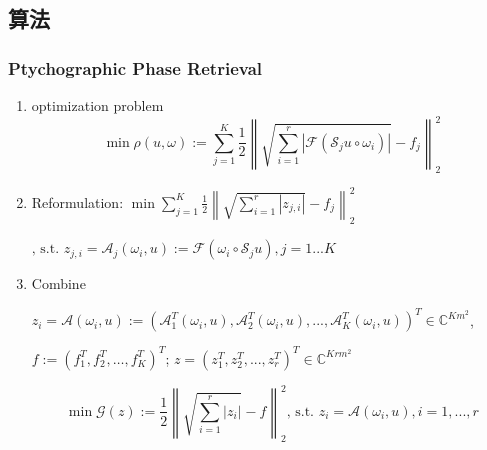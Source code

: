 \documentclass[UTF8]{beamer}
\begin{document}
\subsection{算法}
\begin{frame}[c]\frametitle{Ptychographic Phase Retrieval}
	
	\begin{enumerate}
		\item optimization problem
		$$
		\min \rho(u,\omega):=\sum_{j=1}^{K}  \frac{1}{2}\left\|  \sqrt { \sum_{i=1}^{r} \left|\mathcal{F} ( \mathcal{S}_{j} u  \circ \omega_i) \right| }-f_{j}\right\|_{2}^{2}
		$$
		\item Reformulation:
		$
		\min \sum_{j=1}^{K} \frac{1}{2}\left\| \sqrt{ \sum_{i=1}^r \left|z_{j,i}\right| }-f_{j}\right\|_{2}^{2} 
		$
		\begin{small}
				$
			\text {, s.t. } z_{j,i}= \mathcal{A}_{j}(\omega_i, u):=\mathcal{F}\left(\omega_i \circ \mathcal{S}_{j} u\right),j=1... K
			$
		\end{small}
	
	
		
		
		\item Combine
		\begin{footnotesize}
		 $z_i = \mathcal{A}(\omega_i, u) := \left(\mathcal{A}_{1}^{T}(\omega_i, u), \mathcal{A}_{2}^{T}(\omega_i, u),..., \mathcal{A}_{K}^{T}(\omega_i, u)\right)^{T} 
			\in \mathbb{C}^{ Km^2}$,
			
			$f := (f_1^T,f_2^T, \ldots, f_K^T)^T$;
			$z = (z_1^T,z_2^T,...,z_r^T)^T \in \mathbb{C}^{ Krm^2}$
		\end{footnotesize}
	    \begin{small}
	    		$$
	    	\min \mathcal{G}(z) := \frac{1}{2}\left\| \sqrt{ \sum_{i=1}^r \left|z_{i}\right| } -f\right\|_{2}^{2} \text {, s.t. } z_i= \mathcal{A}(\omega_i, u), i = 1,...,r
	    	$$
	    \end{small}
	
		
	\end{enumerate}
	
	
\end{frame}
\end{document}
